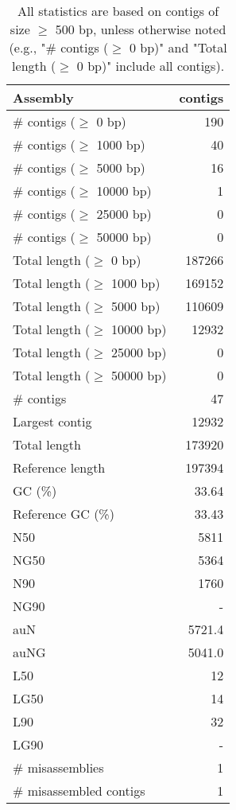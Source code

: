 \documentclass[12pt,a4paper]{article}
\begin{document}
\begin{table}[ht]
\begin{center}
\caption{All statistics are based on contigs of size $\geq$ 500 bp, unless otherwise noted (e.g., "\# contigs ($\geq$ 0 bp)" and "Total length ($\geq$ 0 bp)" include all contigs).}
\begin{tabular}{|l*{1}{|r}|}
\hline
Assembly & contigs \\ \hline
\# contigs ($\geq$ 0 bp) & 190 \\ \hline
\# contigs ($\geq$ 1000 bp) & 40 \\ \hline
\# contigs ($\geq$ 5000 bp) & 16 \\ \hline
\# contigs ($\geq$ 10000 bp) & 1 \\ \hline
\# contigs ($\geq$ 25000 bp) & 0 \\ \hline
\# contigs ($\geq$ 50000 bp) & 0 \\ \hline
Total length ($\geq$ 0 bp) & 187266 \\ \hline
Total length ($\geq$ 1000 bp) & 169152 \\ \hline
Total length ($\geq$ 5000 bp) & 110609 \\ \hline
Total length ($\geq$ 10000 bp) & 12932 \\ \hline
Total length ($\geq$ 25000 bp) & 0 \\ \hline
Total length ($\geq$ 50000 bp) & 0 \\ \hline
\# contigs & 47 \\ \hline
Largest contig & 12932 \\ \hline
Total length & 173920 \\ \hline
Reference length & 197394 \\ \hline
GC (\%) & 33.64 \\ \hline
Reference GC (\%) & 33.43 \\ \hline
N50 & 5811 \\ \hline
NG50 & 5364 \\ \hline
N90 & 1760 \\ \hline
NG90 & - \\ \hline
auN & 5721.4 \\ \hline
auNG & 5041.0 \\ \hline
L50 & 12 \\ \hline
LG50 & 14 \\ \hline
L90 & 32 \\ \hline
LG90 & - \\ \hline
\# misassemblies & 1 \\ \hline
\# misassembled contigs & 1 \\ \hline

\end{tabular}
\end{center}
\end{table}
\end{document}
